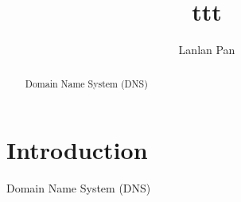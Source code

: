 \documentclass[10pt,sigconf,anonymous]{acmart}
\begin{document}
\title{ttt}

\author{Lanlan Pan}



\renewcommand{\shortauthors}{L. Pan et al.}

\begin{abstract}

    Domain Name System (DNS) \cite{mockapetris1987domain} 

\end{abstract}



\maketitle

\section{Introduction}

Domain Name System (DNS) \cite{mockapetris1987domain} 




 
\end{document}

